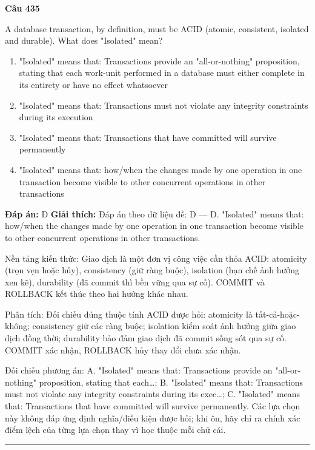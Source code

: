 \documentclass[11pt,a4paper]{article}
\newenvironment{question}[1]{%
  \par\vspace{1em}\noindent\textbf{\large Câu #1}\par\vspace{0.4em}
}{%
  \par\vspace{1em}\hrule\vspace{0.6em}
}
\newenvironment{choices}{%
  \begin{enumerate}[label=\textbf{\Alph*.},leftmargin=2.2em,itemsep=2pt,topsep=3pt]
}{%
  \end{enumerate}
}
\newcommand{\choice}{\item}
\begin{document}
\begin{question}{435}
A database transaction, by definition, must be ACID (atomic, consistent, isolated and durable). What does "Isolated" mean?
\begin{choices}
\choice "Isolated" means that: Transactions provide an "all-or-nothing" proposition, stating that each work-unit performed in a database must either complete in its entirety or have no effect whatsoever
\choice "Isolated" means that: Transactions must not violate any integrity constraints during its execution
\choice "Isolated" means that: Transactions that have committed will survive permanently
\choice "Isolated" means that: how/when the changes made by one operation in one transaction become visible to other concurrent operations in other transactions
\end{choices}
\textbf{Đáp án:} D
\textbf{Giải thích:} Đáp án theo dữ liệu đề: D — D. "Isolated" means that: how/when the changes made by one operation in one transaction become visible to other concurrent operations in other transactions.

Nền tảng kiến thức: Giao dịch là một đơn vị công việc cần thỏa ACID: atomicity (trọn vẹn hoặc hủy), consistency (giữ ràng buộc), isolation (hạn chế ảnh hưởng xen kẽ), durability (đã commit thì bền vững qua sự cố). COMMIT và ROLLBACK kết thúc theo hai hướng khác nhau.

Phân tích: Đối chiếu đúng thuộc tính ACID được hỏi: atomicity là tất-cả-hoặc-không; consistency giữ các ràng buộc; isolation kiểm soát ảnh hưởng giữa giao dịch đồng thời; durability bảo đảm giao dịch đã commit sống sót qua sự cố. COMMIT xác nhận, ROLLBACK hủy thay đổi chưa xác nhận.

Đối chiếu phương án: A. "Isolated" means that: Transactions provide an "all-or-nothing" proposition, stating that each…; B. "Isolated" means that: Transactions must not violate any integrity constraints during its exec…; C. "Isolated" means that: Transactions that have committed will survive permanently. Các lựa chọn này không đáp ứng định nghĩa/điều kiện được hỏi; khi ôn, hãy chỉ ra chính xác điểm lệch của từng lựa chọn thay vì học thuộc mỗi chữ cái.
\end{question}
\end{document}
